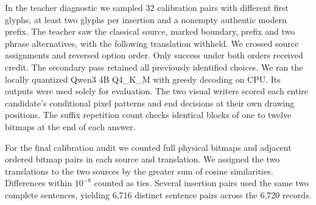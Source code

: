 In the teacher diagnostic we sampled 32 calibration pairs with different first glyphs, at least two glyphs per insertion and a nonempty authentic modern prefix. The teacher saw the classical source, marked boundary, prefix and two phrase alternatives, with the following translation withheld. We crossed source assignments and reversed option order. Only success under both orders received credit. The secondary pass retained all previously identified choices. We ran the locally quantized Qwen3 4B Q4\_K\_M with greedy decoding on CPU. Its outputs were used solely for evaluation. The two visual writers scored each entire candidate's conditional pixel patterns and end decisions at their own drawing positions. The suffix repetition count checks identical blocks of one to twelve bitmaps at the end of each answer.

For the final calibration audit we counted full physical bitmaps and adjacent ordered bitmap pairs in each source and translation. We assigned the two translations to the two sources by the greater sum of cosine similarities. Differences within $10^{-8}$ counted as ties. Several insertion pairs used the same two complete sentences, yielding 6,716 distinct sentence pairs across the 6,720 records.
